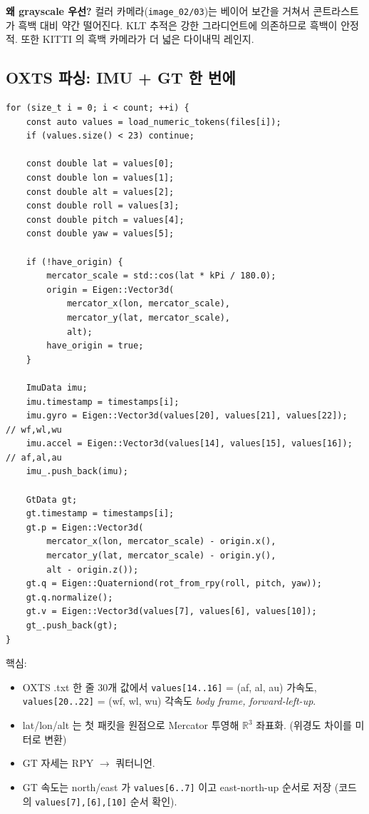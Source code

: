 \documentclass[11pt,a4paper,oneside]{report}
\newcommand{\R}{\mathbb{R}}
\begin{document}
\textbf{왜 grayscale 우선?} 컬러 카메라(\texttt{image\_02/03})는 베이어 보간을 거쳐서 콘트라스트가 흑백 대비 약간 떨어진다. KLT 추적은 강한 그라디언트에 의존하므로 흑백이 안정적. 또한 KITTI 의 흑백 카메라가 더 넓은 다이내믹 레인지.

\subsection{OXTS 파싱: IMU + GT 한 번에}

\begin{lstlisting}[style=cpp,caption={\texttt{kitti\_raw\_reader.cpp:170-205}, 핵심부}]
for (size_t i = 0; i < count; ++i) {
    const auto values = load_numeric_tokens(files[i]);
    if (values.size() < 23) continue;

    const double lat = values[0];
    const double lon = values[1];
    const double alt = values[2];
    const double roll = values[3];
    const double pitch = values[4];
    const double yaw = values[5];

    if (!have_origin) {
        mercator_scale = std::cos(lat * kPi / 180.0);
        origin = Eigen::Vector3d(
            mercator_x(lon, mercator_scale),
            mercator_y(lat, mercator_scale),
            alt);
        have_origin = true;
    }

    ImuData imu;
    imu.timestamp = timestamps[i];
    imu.gyro = Eigen::Vector3d(values[20], values[21], values[22]);  // wf,wl,wu
    imu.accel = Eigen::Vector3d(values[14], values[15], values[16]); // af,al,au
    imu_.push_back(imu);

    GtData gt;
    gt.timestamp = timestamps[i];
    gt.p = Eigen::Vector3d(
        mercator_x(lon, mercator_scale) - origin.x(),
        mercator_y(lat, mercator_scale) - origin.y(),
        alt - origin.z());
    gt.q = Eigen::Quaterniond(rot_from_rpy(roll, pitch, yaw));
    gt.q.normalize();
    gt.v = Eigen::Vector3d(values[7], values[6], values[10]);
    gt_.push_back(gt);
}
\end{lstlisting}

핵심:
\begin{itemize}
\item OXTS .txt 한 줄 30개 값에서 \texttt{values[14..16]} = (af, al, au) 가속도, \texttt{values[20..22]} = (wf, wl, wu) 각속도 \emph{body frame, forward-left-up}.
\item lat/lon/alt 는 첫 패킷을 원점으로 Mercator 투영해 \(\R^3\) 좌표화. (위경도 차이를 미터로 변환)
\item GT 자세는 RPY \(\to\) 쿼터니언.
\item GT 속도는 north/east 가 \texttt{values[6..7]} 이고 east-north-up 순서로 저장 (코드의 \texttt{values[7],[6],[10]} 순서 확인).
\end{itemize}
\end{document}
